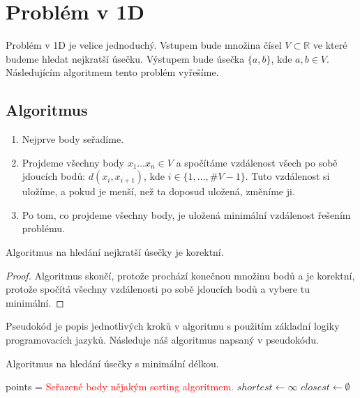 \chapter{Problém v 1D}
\label{chap:problem_1D}
Problém v 1D je velice jednoduchý. Vstupem bude množina čísel $V \subset \mathbb{R}$ ve které budeme hledat nejkratší úsečku. Výstupem bude úsečka $\{a, b\}$, kde $ a, b \in V$. Následujícím algoritmem tento problém vyřešíme.

\section{Algoritmus}
\label{sec:algoritmus_1D}
\begin{enumerate}
    \item Nejprve body seřadíme.
    \item Projdeme všechny body $x_1\ldots x_n \in V$ a spočítáme vzdálenost všech po sobě jdoucích bodů: $d(x_i, x_{i+1})$, kde $i \in \{1,...,\#V-1\}$. Tuto vzdálenost si uložíme, a pokud je menší, než ta doposud uložená, změníme ji. 
    \item Po tom, co projdeme všechny body, je uložená minimální vzdálenost řešením problému. 
\end{enumerate}
\begin{tvrzeni}
    Algoritmus na hledání nejkratší úsečky je korektní.
\end{tvrzeni}
\begin{proof}
    Algoritmus skončí, protože prochází konečnou množinu bodů a je korektní, protože spočítá všechny vzdálenosti po sobě jdoucích bodů a vybere tu minimální. 
\end{proof}
\begin{poznamka}
    Pseudokód je popis jednotlivých kroků v algoritmu s použitím základní logiky programovacích jazyků. Následuje náš algoritmus napsaný v pseudokódu.
\end{poznamka}
\begin{algorithm}
    \caption{Algoritmus na hledání úsečky s minimální délkou.}
    \label{alg:algoritmus_1D}

   
    \BlankLine
    points = \textcolor{red}{Seřazené body nějakým sorting algoritmem.} \;
    $shortest \leftarrow \infty$ \;
    $ closest \leftarrow \emptyset $ \;
\end{algorithm}